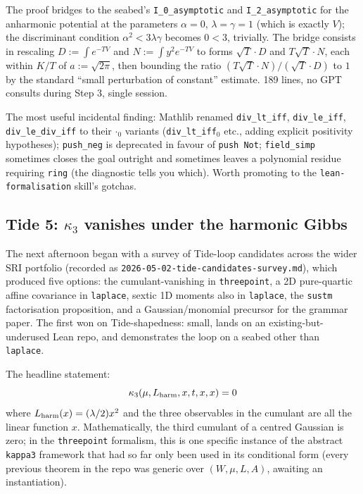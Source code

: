 \documentclass[11pt]{article}
\begin{document}
The proof bridges to the seabed's
\texttt{I\_0\_asymptotic} and \texttt{I\_2\_asymptotic} for the
anharmonic potential at the parameters $\alpha = 0$, $\lambda = \gamma
= 1$ (which is exactly $V$); the discriminant condition $\alpha^2 <
3\lambda\gamma$ becomes $0 < 3$, trivially. The bridge consists in
rescaling $D := \int e^{-TV}$ and $N := \int y^2 e^{-TV}$ to forms
$\sqrt T \cdot D$ and $T\sqrt T \cdot N$, each within $K/T$ of $a :=
\sqrt{2\pi}$, then bounding the ratio $(T\sqrt T \cdot N)/(\sqrt T
\cdot D)$ to $1$ by the standard ``small perturbation of constant''
estimate. 189 lines, no GPT consults during Step 3, single session.

The most useful incidental finding: Mathlib renamed
\texttt{div\_lt\_iff}, \texttt{div\_le\_iff},
\texttt{div\_le\_div\_iff} to their \texttt{$\cdot{}_0$} variants
(\texttt{div\_lt\_iff${}_0$} etc., adding explicit positivity
hypotheses); \texttt{push\_neg} is deprecated in favour of \texttt{push
Not}; \texttt{field\_simp} sometimes closes the goal outright and
sometimes leaves a polynomial residue requiring \texttt{ring} (the
diagnostic tells you which). Worth promoting to the
\texttt{lean-formalisation} skill's gotchas.

\subsection*{Tide 5: $\kappa_3$ vanishes under the harmonic Gibbs}

The next afternoon began with a survey of Tide-loop candidates across
the wider SRI portfolio (recorded as
\texttt{2026-05-02-tide-candidates-survey.md}), which produced five
options: the cumulant-vanishing in \texttt{threepoint}, a 2D
pure-quartic affine covariance in \texttt{laplace}, sextic 1D moments
also in \texttt{laplace}, the \texttt{sustm} factorisation
proposition, and a Gaussian/monomial precursor for the grammar paper.
The first won on Tide-shapedness: small, lands on an
existing-but-underused Lean repo, and demonstrates the loop on a
seabed other than \texttt{laplace}.

The headline statement:
\[
\kappa_3(\mu, L_{\rm harm}, x, t, x, x) = 0
\]
where $L_{\rm harm}(x) = (\lambda/2) x^2$ and the three observables in
the cumulant are all the linear function $x$. Mathematically, the
third cumulant of a centred Gaussian is zero; in the
\texttt{threepoint} formalism, this is one specific instance of the
abstract \texttt{kappa3} framework that had so far only been used in
its conditional form (every previous theorem in the repo was generic
over $(W, \mu, L, A)$, awaiting an instantiation).
\end{document}
